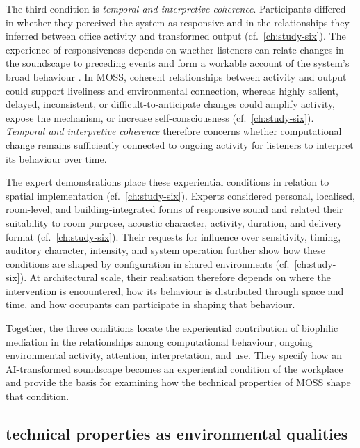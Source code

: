 The third condition is \emph{temporal and interpretive coherence}. Participants differed in whether they perceived the system as responsive and in the relationships they inferred between office activity and transformed output (cf.~\autoref{ch:study-six}). The experience of responsiveness depends on whether listeners can relate changes in the soundscape to preceding events and form a workable account of the system's broad behaviour \cite{bellotti2002making,lim2009and}. In MOSS, coherent relationships between activity and output could support liveliness and environmental connection, whereas highly salient, delayed, inconsistent, or difficult-to-anticipate changes could amplify activity, expose the mechanism, or increase self-consciousness (cf.~\autoref{ch:study-six}). \emph{Temporal and interpretive coherence} therefore concerns whether computational change remains sufficiently connected to ongoing activity for listeners to interpret its behaviour over time.

The expert demonstrations place these experiential conditions in relation to spatial implementation (cf.~\autoref{ch:study-six}). Experts considered personal, localised, room-level, and building-integrated forms of responsive sound and related their suitability to room purpose, acoustic character, activity, duration, and delivery format (cf.~\autoref{ch:study-six}). Their requests for influence over sensitivity, timing, auditory character, intensity, and system operation further show how these conditions are shaped by configuration in shared environments (cf.~\autoref{ch:study-six}). At architectural scale, their realisation therefore depends on where the intervention is encountered, how its behaviour is distributed through space and time, and how occupants can participate in shaping that behaviour.

Together, the three conditions locate the experiential contribution of biophilic mediation in the relationships among computational behaviour, ongoing environmental activity, attention, interpretation, and use. They specify how an AI-transformed soundscape becomes an experiential condition of the workplace and provide the basis for examining how the technical properties of MOSS shape that condition.


\subsection{technical properties as environmental qualities}
\label{subsec:technical-experiential}

